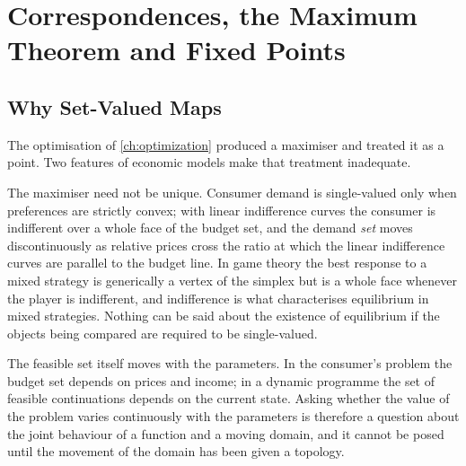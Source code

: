 
\chapter{Correspondences, the Maximum Theorem and Fixed Points}
\label{ch:maximum}

\section{Why Set-Valued Maps}\label{sec:corr-motivation}

The optimisation of \autoref{ch:optimization} produced a maximiser and treated it
as a point. Two features of economic models make that treatment inadequate.

The maximiser need not be unique. Consumer demand is single-valued only when
preferences are strictly convex; with linear indifference curves the consumer is
indifferent over a whole face of the budget set, and the demand \emph{set} moves
discontinuously as relative prices cross the ratio at which the linear
indifference curves are parallel to the budget line. In game theory the best
response to a mixed strategy is generically a vertex of the simplex but is a
whole face whenever the player is indifferent, and indifference is what
characterises equilibrium in mixed strategies. Nothing can be said about the
existence of equilibrium if the objects being compared are required to be
single-valued.

The feasible set itself moves with the parameters. In the consumer's problem the
budget set depends on prices and income; in a dynamic programme the set of
feasible continuations depends on the current state. Asking whether the value of
the problem varies continuously with the parameters is therefore a question about
the joint behaviour of a function and a moving domain, and it cannot be posed
until the movement of the domain has been given a topology.


